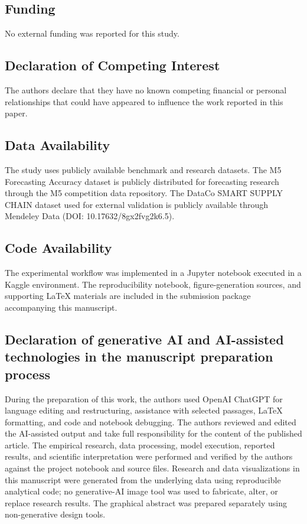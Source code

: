 \subsection*{Funding}
No external funding was reported for this study.

\subsection*{Declaration of Competing Interest}
The authors declare that they have no known competing financial or personal relationships that could have appeared to influence the work reported in this paper.

\subsection*{Data Availability}
The study uses publicly available benchmark and research datasets. The M5 Forecasting Accuracy dataset is publicly distributed for forecasting research through the M5 competition data repository. The DataCo SMART SUPPLY CHAIN dataset used for external validation is publicly available through Mendeley Data (DOI: 10.17632/8gx2fvg2k6.5).

\subsection*{Code Availability}
The experimental workflow was implemented in a Jupyter notebook executed in a Kaggle environment. The reproducibility notebook, figure-generation sources, and supporting LaTeX materials are included in the submission package accompanying this manuscript.

\subsection*{Declaration of generative AI and AI-assisted technologies in the manuscript preparation process}
During the preparation of this work, the authors used OpenAI ChatGPT for language editing and restructuring, assistance with selected passages, LaTeX formatting, and code and notebook debugging. The authors reviewed and edited the AI-assisted output and take full responsibility for the content of the published article.
The empirical research, data processing, model execution, reported results, and scientific interpretation were performed and verified by the authors against the project notebook and source files. Research and data visualizations in this manuscript were generated from the underlying data using reproducible analytical code; no generative-AI image tool was used to fabricate, alter, or replace research results. The graphical abstract was prepared separately using non-generative design tools.





